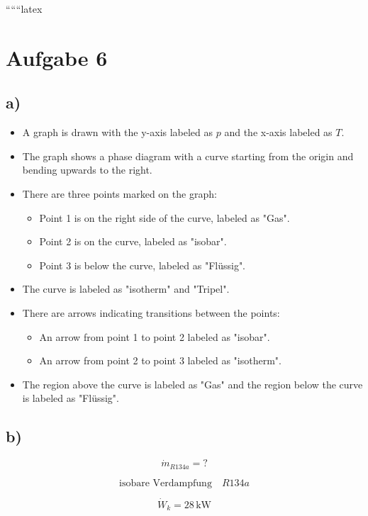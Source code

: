 
``````latex


\section*{Aufgabe 6}

\subsection*{a)}

\begin{itemize}
    \item A graph is drawn with the y-axis labeled as \( p \) and the x-axis labeled as \( T \).
    \item The graph shows a phase diagram with a curve starting from the origin and bending upwards to the right.
    \item There are three points marked on the graph:
        \begin{itemize}
            \item Point 1 is on the right side of the curve, labeled as "Gas".
            \item Point 2 is on the curve, labeled as "isobar".
            \item Point 3 is below the curve, labeled as "Flüssig".
        \end{itemize}
    \item The curve is labeled as "isotherm" and "Tripel".
    \item There are arrows indicating transitions between the points:
        \begin{itemize}
            \item An arrow from point 1 to point 2 labeled as "isobar".
            \item An arrow from point 2 to point 3 labeled as "isotherm".
        \end{itemize}
    \item The region above the curve is labeled as "Gas" and the region below the curve is labeled as "Flüssig".
\end{itemize}

\subsection*{b)}

\[
\dot{m}_{R134a} = ?
\]

\[
\text{isobare Verdampfung} \quad R134a
\]

\[
\dot{W}_k = 28 \, \text{kW}
\]

